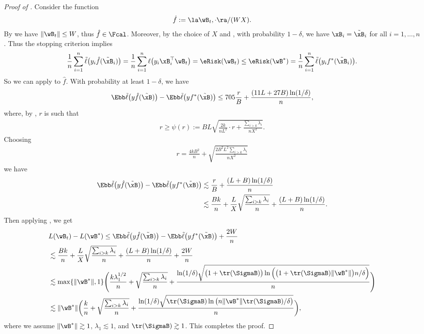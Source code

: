 \documentclass[11pt]{article}
\begin{document}
\begin{proof}[Proof of ]
Consider the function 
\[\hat f:= \la \wB_t, \cdot \ra / (WX).\]
By  we have $\|\wB_t\|\le W$, thus $\hat f\in \Fcal$.
Moreover, by the choice of $X$ and , with probability $1-\delta$, we have $\xB_i = \tilde\xB_i$ for all $i=1,\dots,n$.
Thus the stopping criterion implies 
\begin{align*}
    \frac{1}{n}\sum_{i=1}^n\tilde\ell\big(y_i \hat f(\tilde\xB_i) \big)
    = \frac{1}{n}\sum_{i=1}^n \ell\big(y_i \xB_i^\top \wB_t \big)
    = \eRisk(\wB_t) \le \eRisk(\wB^*)
    = \frac{1}{n}\sum_{i=1}^n\tilde\ell\big(y_i f^*(\tilde\xB_i) \big).
\end{align*}
So we can apply  to $\hat f$.
With probability at least $1-\delta$, we have 
\begin{align*}
    \Ebb \tilde\ell\big(y \hat f (\tilde \xB)\big) -  \Ebb \tilde\ell\big(y  f^* (\tilde\xB)\big) \le 705 \frac{r}{B} + \frac{(11L + 27B)\ln(1/\delta)}{n},
\end{align*}
where, by , $r$ is such that 
\begin{align*}
    r \ge \psi(r):= BL \sqrt{\frac{2k}{nL^2}\cdot r + \frac{\sum_{i>k}\lambda_i}{nX^2} }.
\end{align*}
Choosing 
\begin{align*}
    r = \frac{4k B^2}{n} + \sqrt{\frac{2B^2L^2\sum_{i>k}\lambda_i}{nX^2} }
\end{align*}
we have
\begin{align*}
    \Ebb \tilde\ell\big(y \hat f (\tilde \xB)\big) -  \Ebb \tilde\ell\big(y  f^* (\tilde\xB)\big)
    &\lesssim \frac{r}{B} + \frac{(L+B)\ln(1/\delta)}{n} \\
    &\lesssim  \frac{B k}{n} + \frac{L}{X} \sqrt{\frac{\sum_{i>k}\lambda_i}{n}} + \frac{(L+B)\ln(1/\delta)}{n} .
\end{align*}
Then applying , we get
\begin{align*}
    &\lefteqn{L(\wB_t) - L(\wB^*)
    \le  \Ebb \tilde\ell\big(y \hat f (\tilde \xB)\big) -  \Ebb \tilde\ell\big(y  f^* (\tilde\xB)\big) + \frac{2W}{n}} \\
    &\lesssim  \frac{B k}{n} + \frac{L}{X} \sqrt{\frac{\sum_{i>k}\lambda_i}{n}} + \frac{(L+B)\ln(1/\delta)}{n}+ \frac{2W}{n} \\
    &\lesssim \max\{\|\wB^*\|, 1\} \Bigg( \frac{k\lambda_1^{1/2}}{n} + \sqrt{\frac{\sum_{i>k}\lambda_i}{n}} + \frac{ \ln (1/\delta) \sqrt{ \big(1+\tr(\SigmaB)\big)\ln\Big(\big(1+\tr(\SigmaB)\|\wB^*\|\big) n /\delta\Big) }}{n} \Bigg)\\
    &\lesssim \|\wB^*\| \bigg( \frac{k}{n} + \sqrt{\frac{\sum_{i>k}\lambda_i}{n}} + \frac{ \ln (1/\delta) \sqrt{ \tr(\SigmaB)\ln\big(n \|\wB^*\|\tr(\SigmaB) /\delta\big) }}{n} \bigg),
\end{align*}
where we assume $\|\wB^*\|\gtrsim 1$, $\lambda_1 \lesssim 1$, and $\tr(\SigmaB)\gtrsim 1$.
This completes the proof.
\end{proof}
\end{document}
